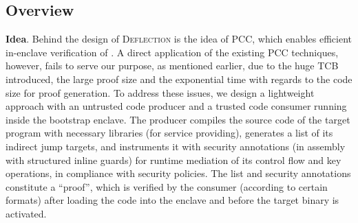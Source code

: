 





\subsection{Overview}
\label{subsec-overview}

\noindent\textbf{Idea}. Behind the design of \textsc{Deflection} is the idea of PCC, which enables efficient in-enclave verification of . A direct application of the existing PCC techniques, however, fails to serve our purpose, as mentioned earlier, due to the huge TCB introduced, the large proof size and the exponential time with regards to the code size for proof generation. To address these issues, we design a lightweight 
approach with an untrusted code producer and a trusted code consumer running inside the bootstrap enclave. The producer compiles the source code of the target program with necessary libraries (for service providing), generates a list of its indirect jump targets, and instruments it with security annotations (in assembly with structured inline guards) for runtime mediation of its control flow and key operations, in compliance with security policies. The list and security annotations constitute a ``proof'', which is verified by the consumer (according to certain formats) after loading the code into the enclave and before the target binary is activated. 

